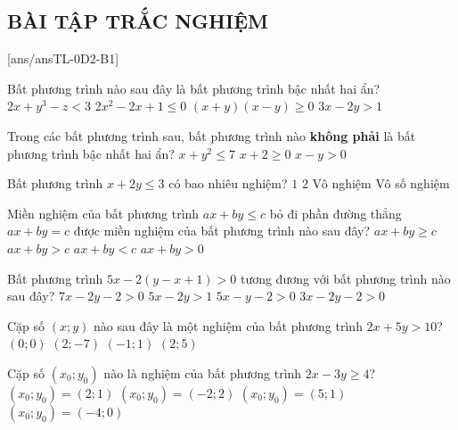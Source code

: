\subsection{BÀI TẬP TRẮC NGHIỆM}
[ans/ansTL-0D2-B1]

\begin{ex}%
	Bất phương trình nào sau đây là bất phương trình bậc nhất hai ẩn?
	\choice
	{$2x+y^3-z<3$}
	{$2x^2-2x+1\leq 0$}
	{$(x+y)(x-y)\geq 0$}
	{\True $3x-2y>1$}
	\loigiai{
	}
\end{ex}

\begin{ex}%
	Trong các bất phương trình sau, bất phương trình nào \textbf{không phải} là bất phương trình bậc nhất hai ẩn?
	{\True $x+y^2 \leq 7$}
	{$x+2 \geq 0$}
	{$x-y>0$}
	\loigiai{
	}
\end{ex}

\begin{ex}%
	Bất phương trình $x+2y\leq 3$ có bao nhiêu nghiệm?
	\choice
	{$1$}
	{$2$}
	{Vô nghiệm}
	{\True Vô số nghiệm}
	\loigiai{
	}
\end{ex}

\begin{ex}
	Miền nghiệm của bất phương trình $ax+by\leq c$ bỏ đi phần đường thẳng $ax+by=c$ được miền nghiệm của bất phương trình nào sau đây?
	\choice
	{$ax+by\geq c$}
	{$ax+by>c $}
	{\True $ax+by<c $}
	{$ ax+by>0$}
	\loigiai{
	}
\end{ex}

\begin{ex}%
	Bất phương trình $ 5x-2(y-x+1)>0$ tương đương với bất phương trình nào sau đây?
	\choice
	{\True $7x-2y-2>0$}
	{$5x-2y>1$}
	{$5x-y-2>0$}
	{$3x-2y-2>0$}
\end{ex}

\begin{ex}%
	Cặp số $(x;y)$ nào sau đây là một nghiệm của bất phương trình $2x+5y>10$?
	\choice
	{$(0;0)$}
	{$(2;-7)$}
	{$(-1;1) $}
	{\True $(2;5)$}
\end{ex}

\begin{ex}%
	Cặp số $(x_0;y_0)$ nào là nghiệm của bất phương trình $2x-3y\geq 4$?
	\choice
	{$(x_0;y_0)=(2;1)$}
	{$(x_0;y_0)=(-2;2)$}
	{\True $(x_0;y_0)=(5;1)$}
	{$(x_0;y_0)=(-4;0)$}
\end{ex}

